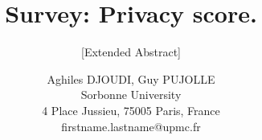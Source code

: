 \documentclass{../../setup/sig-alternate}
\begin{document}
\title{Survey: Privacy score.
}

\subtitle{[Extended Abstract]
}

\author{
	Aghiles DJOUDI, Guy PUJOLLE \\ \textsf{Sorbonne University} \\ \textsf{4 Place Jussieu, 75005 Paris, France} \\ \textsf{firstname.lastname@upmc.fr}
}











\printbibliography

\onecolumn


\end{document}
